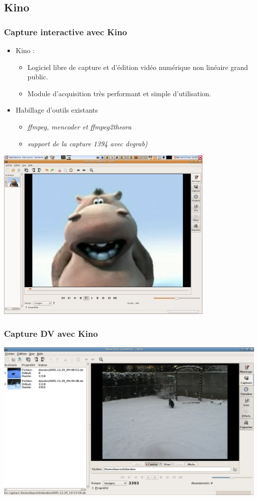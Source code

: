 \subsection{Kino}
 \begin{frame}
 \frametitle{Capture interactive avec Kino}
 \begin{itemize}
 \item Kino : 
  \begin{itemize}
 \item Logiciel libre de capture et d'édition vidéo numérique non linéaire grand public.
 \item Module d'acquisition très performant et simple d'utilisation.
 \end{itemize}
 
 \item Habillage d'outils existants
  \begin{itemize}
 \item \textit{ffmpeg, mencoder et ffmpeg2theora}
 \item \textit{support de la capture 1394 avec dvgrab)}
 \end{itemize} \end{itemize}
 \includegraphics[scale=0.25]{ressources/ecran_kino.jpg}
 \end{frame}
 
 \begin{frame}
 \frametitle{Capture DV avec Kino}
  \includegraphics[scale=0.20]{ressources/capture_kino.jpg}
 \end{frame}
 
